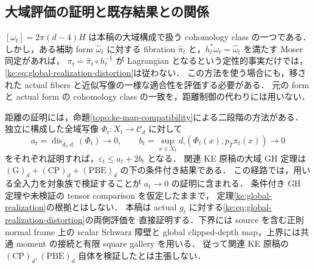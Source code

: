 \subsection{大域評価の証明と既存結果との関係}
\label{ke:global-realization-transfer}

$[\omega_t]=2\pi(d-4)H$ は本稿の大域構成で扱う cohomology class の一つである．
しかし，ある補助 form $\widehat\omega_t$ に対する fibration
$\widehat\pi_t$ と，$h_t^*\omega_t=\widehat\omega_t$ を満たす Moser 同定があれば，
$\pi_t=\widehat\pi_t\circ h_t^{-1}$ が Lagrangian となるという定性的事実だけでは，
\eqref{ke:eq:global-realization-distortion}は従わない．
この方法を使う場合にも，移された actual fibers と近似写像の一様な適合性を評価する必要がある．
元の form と actual form の cohomology class の一致を，距離制御の代わりには用いない．

距離の証明には，命題\ref{topo:ke-map-compatibility}による二段階の方法がある．
独立に構成した全域写像 $\Phi_t:X_t\to\mathcal C_d$ に対して
\[
 a_t=\operatorname{dis}_{\bar d_t,d_\square}(\Phi_t)\longrightarrow0,
 \qquad
 b_t=\sup_{x\in X_t}d_\square(\Phi_t(x),p_T\pi_t(x))\longrightarrow0
\]
をそれぞれ証明すれば，$\varepsilon_t\le a_t+2b_t$ となる．
関連 KE 原稿\cite{KECubicalCurrent}の大域 GH 定理は
$\mathrm{(G)}_d+\mathrm{(CP)}_d+\mathrm{(PBE)}_d$ の下の条件付き結果である．
この経路では，用いる全入力を対象族で検証することが $a_t\to0$ の証明に含まれる．
条件付き GH 定理や未検証の tensor comparison を仮定したままで，
定理\ref{ke:global-realization}の根拠とはしない．
本稿は actual $g_t$ に対する\eqref{ke:eq:global-realization-distortion}の両側評価を
直接証明する．下界には source を含む正則 normal frame 上の scalar Schwarz 障壁と
global clipped-depth map，上界には共通 moment の接続と有限 square gallery を用いる．
従って関連 KE 原稿の $\mathrm{(CP)}_d,\mathrm{(PBE)}_d$ 自体を検証したとは主張しない．

